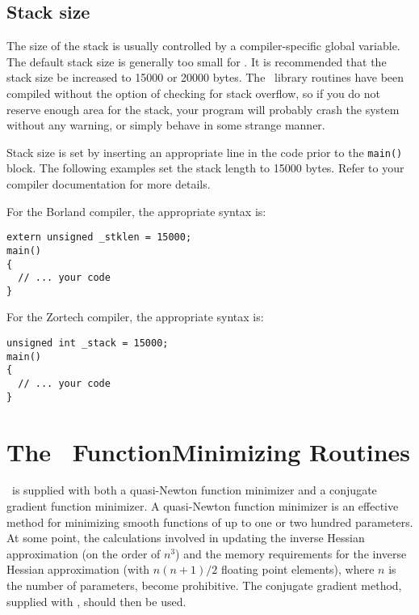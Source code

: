 \documentclass{admbmanual}
\begin{document}
\section{Stack size}

The size of the stack is usually controlled by a compiler-specific global
variable. The default stack size is generally too small for \scAD. It is
recommended that the stack size be increased to 15000 or 20000 bytes. The \scAD\
library routines have been compiled without the option of checking for stack
overflow, so if you do not reserve enough area for the stack, your program will
probably crash the system without any warning, or simply behave in some strange
manner.

Stack size is set by inserting an appropriate line in the code prior to the
\texttt{main()} block. The following examples set the stack length to 15000
bytes. Refer to your compiler documentation for more details.

For the Borland compiler, the appropriate syntax is:
\begin{lstlisting}
extern unsigned _stklen = 15000;
main()
{
  // ... your code
}
\end{lstlisting}
\noindent For the Zortech compiler, the appropriate syntax is:
\begin{lstlisting}
unsigned int _stack = 15000;
main()
{
  // ... your code
}
\end{lstlisting}


\chapter{The \scAD\ Function\br Minimizing Routines}
\label{ch:function-minimizing}

\scAD\ is supplied with both a quasi-Newton function minimizer and a conjugate
gradient function minimizer. A quasi-Newton function minimizer is an effective
method for minimizing smooth functions of up to one or two hundred parameters.
At some point, the calculations involved in updating the inverse Hessian
approximation (on the order of $n^3$) and the memory requirements for the
inverse Hessian approximation (with $n(n+1)/2$ floating point elements), where
$n$ is the number of parameters, become prohibitive. The conjugate gradient
method, supplied with \scAD, should then be used.
\end{document}
